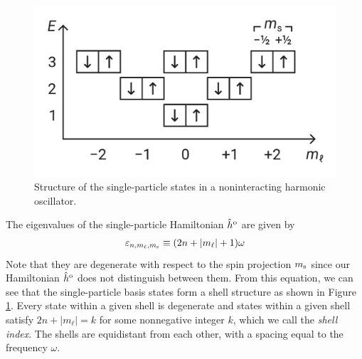 \documentclass[amsmath, amssymb, aps, floatfix, nofootinbib, preprintnumbers,showpacs, superscriptaddress, twocolumn]{revtex4-1}
\begin{document}
\begin{figure}
\includegraphics[width=.48\textwidth]{fig-shell-structure}
\caption{Structure of the single-particle states in a noninteracting harmonic
  oscillator.}
\label{fig:shell-structure}
\end{figure}
The eigenvalues of the single-particle Hamiltonian $\hat h^{\text o}$ are
given by
\begin{align*}
  \varepsilon_{n, m_\ell, m_{\text s}} \equiv (2 n + |m_\ell| + 1) \omega
\end{align*}
Note that they are degenerate with respect to the spin projection
$m_{\text s}$ since our Hamiltonian $\hat h^{\text o}$ does not distinguish
between them.  From this equation, we can see that the single-particle basis
states form a shell structure as shown in Figure \ref{fig:shell-structure}.
Every state within a given shell is degenerate and states within a given shell
satisfy $2 n + |m_\ell| = k$ for some nonnegative integer $k$, which we call
the \textit{shell index}.  The shells are equidistant from each other, with a
spacing equal to the frequency $\omega$.
\end{document}
